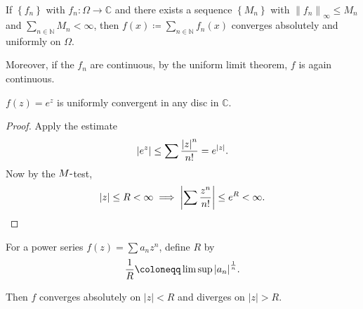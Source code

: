 \begin{theorem}

If \(\left\{{f_n}\right\}\) with \(f_n: \Omega \to {\mathbb{C}}\) and
there exists a sequence \(\left\{{M_n}\right\}\) with
\({\left\lVert {f_n} \right\rVert}_\infty \leq M_n\) and
\(\sum_{n\in {\mathbb{N}}} M_n < \infty\), then
\(f(x) \coloneqq\sum_{n\in {\mathbb{N}}} f_n(x)\) converges absolutely
and uniformly on \(\Omega\).

Moreover, if the \(f_n\) are continuous, by the uniform limit theorem,
\(f\) is again continuous.

\end{theorem}

\begin{proposition}

\(f(z) = e^z\) is uniformly convergent in any disc in \({\mathbb{C}}\).

\end{proposition}

\begin{proof}

Apply the estimate
\begin{align*}  
{\left\lvert {e^z} \right\rvert} \leq \sum {{\left\lvert {z} \right\rvert}^n \over n!} = e^{{\left\lvert {z} \right\rvert}}
.\end{align*}
Now by the \(M{\hbox{-}}\)test,
\begin{align*}  
{\left\lvert {z} \right\rvert} \leq R < \infty \implies {\left\lvert {\sum {z^n \over n!}} \right\rvert} \leq e^R < \infty
.\end{align*}

\end{proof}

\begin{proposition}

For a power series \(f(z) = \sum a_n z^n\), define \(R\) by
\begin{align*}  
{1\over R}\coloneqq\limsup {\left\lvert {a_n} \right\rvert}^{1\over n}
.\end{align*}

Then \(f\) converges absolutely on
\({\left\lvert {z} \right\rvert} < R\) and diverges on
\({\left\lvert {z} \right\rvert} > R\).

\end{proposition}

